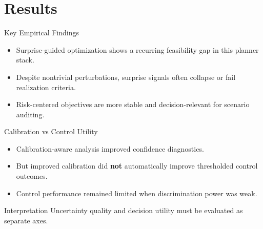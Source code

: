 \section{Results}

\begin{frame}{Key Empirical Findings}
\begin{itemize}
    \item Surprise-guided optimization shows a recurring feasibility gap in this planner stack.
    \item Despite nontrivial perturbations, surprise signals often collapse or fail realization criteria.
    \item Risk-centered objectives are more stable and decision-relevant for scenario auditing.
\end{itemize}
\end{frame}

\begin{frame}{Calibration vs Control Utility}
\begin{itemize}
    \item Calibration-aware analysis improved confidence diagnostics.
    \item But improved calibration did \textbf{not} automatically improve thresholded control outcomes.
    \item Control performance remained limited when discrimination power was weak.
\end{itemize}
\vspace{0.4em}
\begin{block}{Interpretation}
Uncertainty quality and decision utility must be evaluated as separate axes.
\end{block}
\end{frame}
